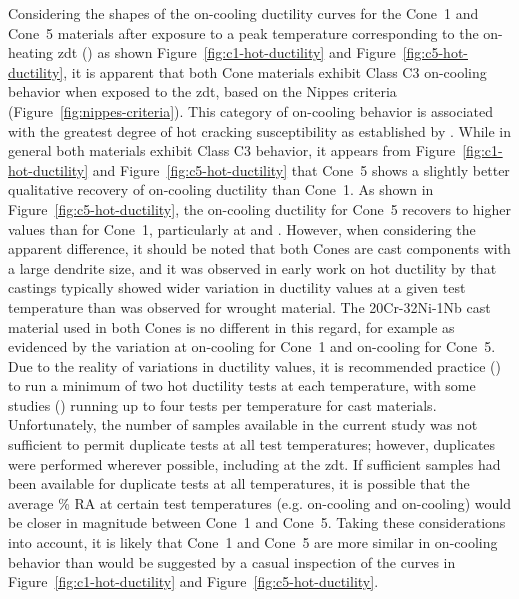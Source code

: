 {Considering the shapes of the on-cooling ductility curves for the Cone~1 and Cone~5 materials after exposure to a peak temperature corresponding to the on-heating \gls{zdt} () as shown Figure~\ref{fig:c1-hot-ductility} and Figure~\ref{fig:c5-hot-ductility}, it is apparent that both Cone materials exhibit Class C3 on-cooling behavior when exposed to the \gls{zdt}, based on the Nippes criteria (Figure~\ref{fig:nippes-criteria}).  This category of on-cooling behavior is associated with the greatest degree of hot cracking susceptibility as established by \citet{nippes_further_1957}.  While in general both materials exhibit Class C3 behavior, it appears from Figure~\ref{fig:c1-hot-ductility} and Figure~\ref{fig:c5-hot-ductility} that Cone~5 shows a slightly better qualitative recovery of on-cooling ductility than Cone~1.  As shown in Figure~\ref{fig:c5-hot-ductility}, the on-cooling ductility for Cone~5 recovers to higher values than for Cone~1, particularly at  and .  However, when considering the apparent difference, it should be noted that both Cones are cast components with a large dendrite size, and it was observed in early work on hot ductility by \citet{nippes_further_1957} that castings typically showed wider variation in ductility values at a given test temperature than was observed for wrought material.  The 20Cr-32Ni-1Nb cast material used in both Cones is no different in this regard, for example as evidenced by the variation at  on-cooling for Cone~1 and  on-cooling for Cone~5.  Due to the reality of variations in ductility values, it is recommended practice (\citet{lundin_standardization_1990_experiment}) to run a minimum of two hot ductility tests at each temperature, with some studies (\citet{nippes_further_1957}) running up to four tests per temperature for cast materials.  Unfortunately, the number of samples available in the current study was not sufficient to permit duplicate tests at all test temperatures; however, duplicates were performed wherever possible, including at the \gls{zdt}.  If sufficient samples had been available for duplicate tests at all temperatures, it is possible that the average \% RA at certain test temperatures (e.g.  on-cooling and  on-cooling) would be closer in magnitude between Cone~1 and Cone~5.  Taking these considerations into account, it is likely that Cone~1 and Cone~5 are more similar in on-cooling behavior than would be suggested by a casual inspection of the curves in Figure~\ref{fig:c1-hot-ductility} and Figure~\ref{fig:c5-hot-ductility}.

}
